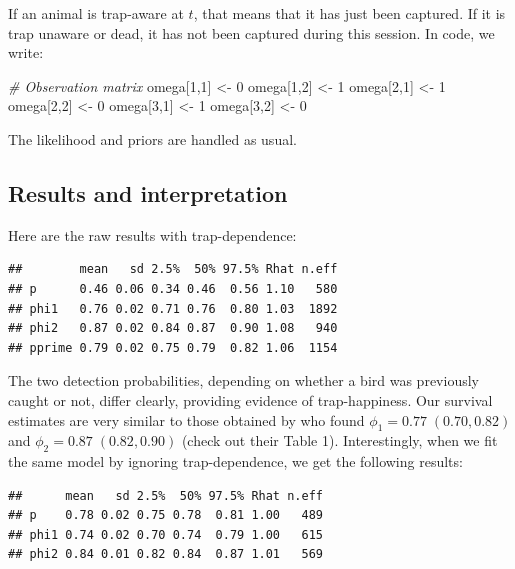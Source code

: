 \documentclass[
  12pt,
]{krantz}
\newenvironment{Shaded}{\begin{snugshade}}{\end{snugshade}}
\newcommand{\CommentTok}[1]{\textcolor[rgb]{0.56,0.35,0.01}{\textit{#1}}}
\newcommand{\DecValTok}[1]{\textcolor[rgb]{0.00,0.00,0.81}{#1}}
\newcommand{\NormalTok}[1]{#1}
\newcommand{\OtherTok}[1]{\textcolor[rgb]{0.56,0.35,0.01}{#1}}
\begin{document}
If an animal is trap-aware at \(t\), that means that it has just been captured. If it is trap unaware or dead, it has not been captured during this session. In code, we write:

\begin{Shaded}
\begin{Highlighting}[]
\CommentTok{\# Observation matrix}
\NormalTok{  omega[}\DecValTok{1}\NormalTok{,}\DecValTok{1}\NormalTok{] }\OtherTok{\textless{}{-}} \DecValTok{0}
\NormalTok{  omega[}\DecValTok{1}\NormalTok{,}\DecValTok{2}\NormalTok{] }\OtherTok{\textless{}{-}} \DecValTok{1}
\NormalTok{  omega[}\DecValTok{2}\NormalTok{,}\DecValTok{1}\NormalTok{] }\OtherTok{\textless{}{-}} \DecValTok{1}
\NormalTok{  omega[}\DecValTok{2}\NormalTok{,}\DecValTok{2}\NormalTok{] }\OtherTok{\textless{}{-}} \DecValTok{0}
\NormalTok{  omega[}\DecValTok{3}\NormalTok{,}\DecValTok{1}\NormalTok{] }\OtherTok{\textless{}{-}} \DecValTok{1}
\NormalTok{  omega[}\DecValTok{3}\NormalTok{,}\DecValTok{2}\NormalTok{] }\OtherTok{\textless{}{-}} \DecValTok{0}
\end{Highlighting}
\end{Shaded}

The likelihood and priors are handled as usual.

\subsection{Results and interpretation}\label{results-and-interpretation-3}

Here are the raw results with trap-dependence:

\begin{verbatim}
##        mean   sd 2.5%  50% 97.5% Rhat n.eff
## p      0.46 0.06 0.34 0.46  0.56 1.10   580
## phi1   0.76 0.02 0.71 0.76  0.80 1.03  1892
## phi2   0.87 0.02 0.84 0.87  0.90 1.08   940
## pprime 0.79 0.02 0.75 0.79  0.82 1.06  1154
\end{verbatim}

The two detection probabilities, depending on whether a bird was previously caught or not, differ clearly, providing evidence of trap-happiness. Our survival estimates are very similar to those obtained by \citet{pradeltrapdep2012} who found \(\phi_1 = 0.77\; (0.70, 0.82)\) and \(\phi_2 = 0.87\; (0.82,0.90)\) (check out their Table 1). Interestingly, when we fit the same model by ignoring trap-dependence, we get the following results:

\begin{verbatim}
##      mean   sd 2.5%  50% 97.5% Rhat n.eff
## p    0.78 0.02 0.75 0.78  0.81 1.00   489
## phi1 0.74 0.02 0.70 0.74  0.79 1.00   615
## phi2 0.84 0.01 0.82 0.84  0.87 1.01   569
\end{verbatim}
\end{document}
